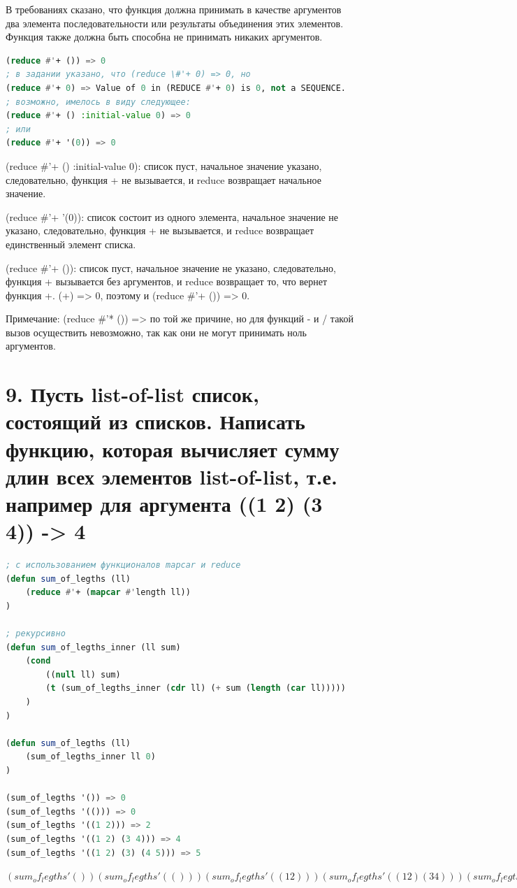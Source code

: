 \documentclass[12pt]{report}
\begin{document}
В требованиях сказано, что функция должна принимать в качестве аргументов два элемента последовательности или результаты объединения этих элементов. Функция также должна быть способна не принимать никаких аргументов.

\begin{lstlisting}[language=Lisp]
(reduce #'+ ()) => 0
; в задании указано, что (reduce \#'+ 0) => 0, но
(reduce #'+ 0) => Value of 0 in (REDUCE #'+ 0) is 0, not a SEQUENCE.
; возможно, имелось в виду следующее:
(reduce #'+ () :initial-value 0) => 0
; или
(reduce #'+ '(0)) => 0
\end{lstlisting}

(reduce \#'+ () :initial-value 0): список пуст, начальное значение указано, следовательно, функция + не вызывается, и reduce возвращает начальное значение.

(reduce \#'+ '(0)): список состоит из одного элемента, начальное значение не указано, следовательно, функция + не вызывается, и reduce возвращает единственный элемент списка.

(reduce \#'+ ()): список пуст, начальное значение не указано, следовательно, функция + вызывается без аргументов, и reduce возвращает то, что вернет функция +. (+) => 0, поэтому и (reduce \#'+ ()) => 0.

Примечание: (reduce \#'* ()) => по той же причине, но для функций - и / такой вызов осуществить невозможно, так как они не могут принимать ноль аргументов.

\clearpage
\section*{9. Пусть list-of-list список, состоящий из списков. Написать функцию, которая вычисляет сумму длин всех элементов list-of-list, т.е. например для аргумента ((1 2) (3 4)) -> 4}


\begin{lstlisting}[language=Lisp]
; с использованием функционалов mapcar и reduce 
(defun sum_of_legths (ll) 
	(reduce #'+ (mapcar #'length ll))
)

; рекурсивно
(defun sum_of_legths_inner (ll sum) 
	(cond 
		((null ll) sum)
		(t (sum_of_legths_inner (cdr ll) (+ sum (length (car ll)))))
	)
)

(defun sum_of_legths (ll) 
	(sum_of_legths_inner ll 0)
)

(sum_of_legths '()) => 0
(sum_of_legths '(())) => 0
(sum_of_legths '((1 2))) => 2
(sum_of_legths '((1 2) (3 4))) => 4
(sum_of_legths '((1 2) (3) (4 5))) => 5
\end{lstlisting}

$
(sum_of_legths '())
(sum_of_legths '(()))
(sum_of_legths '((1 2)))
(sum_of_legths '((1 2) (3 4)))
(sum_of_legths '((1 2) (3) (4 5)))
$
\fi

	

	
\end{document}

